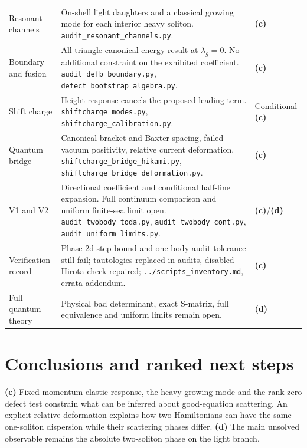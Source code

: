 \documentclass[11pt,a4paper]{article}
\newcommand{\Lc}{\textsf{\textbf{(c)}}\xspace}
\newcommand{\Ld}{\textsf{\textbf{(d)}}\xspace}
\newcommand{\file}[1]{\nolinkurl{#1}}
\theoremstyle{remark}\newtheorem{remark}[proposition]{Remark}
\begin{document}
\begin{longtable}{@{}L{3cm}L{8.8cm}L{2.5cm}@{}}
Resonant channels & On-shell light daughters and a classical growing mode for
each interior heavy soliton. \file{audit_resonant_channels.py}. & \Lc\\
Boundary and fusion & All-triangle canonical energy result at $\lambda_g=0$.
No additional constraint on the exhibited coefficient.
\file{audit_defb_boundary.py}, \file{defect_bootstrap_algebra.py}. & \Lc\\
Shift charge & Height response cancels the proposed leading term.
\file{shiftcharge_modes.py}, \file{shiftcharge_calibration.py}. & Conditional \Lc\\
Quantum bridge & Canonical bracket and Baxter spacing, failed vacuum
positivity, relative current deformation. \file{shiftcharge_bridge_hikami.py},
\file{shiftcharge_bridge_deformation.py}. & \Lc\\
V1 and V2 & Directional coefficient and conditional half-line expansion.
Full continuum comparison and uniform finite-sea limit open.
\file{audit_twobody_toda.py}, \file{audit_twobody_cont.py},
\file{audit_uniform_limits.py}. & \Lc/\Ld\\
Verification record & Phase 2d step bound and one-body audit tolerance still
fail; tautologies replaced in audits, disabled Hirota check repaired;
\file{../scripts_inventory.md}, errata addendum. & \Lc\\
Full quantum theory & Physical bad determinant, exact S-matrix, full equivalence
and uniform limits remain open. & \Ld\\\bottomrule
\end{longtable}
\normalsize

\section{Conclusions and ranked next steps}
\Lc Fixed-momentum elastic response, the heavy growing mode and the
rank-zero defect test constrain what can be inferred about good-equation
scattering. An explicit relative deformation explains how two Hamiltonians
can have the same one-soliton dispersion while their scattering phases
differ. \Ld The main unsolved observable remains the absolute two-soliton
phase on the light branch.
\end{document}
